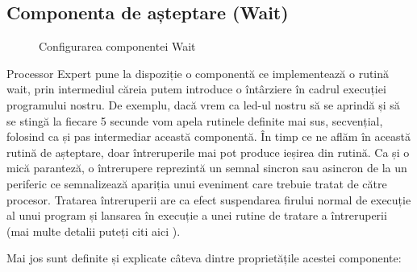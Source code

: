 \newpage

\subsection{Componenta de așteptare (Wait)}

\begin{figure}
    \vspace{-25pt}
    \vspace{-20pt}
    \caption{\label{fig:CodeWarrior-Wait} Configurarea componentei Wait}
    \vspace{-10pt}
\end{figure}

Processor Expert pune la dispoziție o componentă ce implementează o rutină wait, prin intermediul căreia putem introduce o întârziere în cadrul execuției programului nostru. De exemplu, dacă vrem ca led-ul nostru să se aprindă și să se stingă la fiecare 5 secunde vom apela rutinele definite mai sus, secvențial, folosind ca și pas intermediar această componentă. În timp ce ne aflăm în această rutină de așteptare, doar întreruperile mai pot produce ieșirea din rutină. Ca și o mică paranteză, o întrerupere reprezintă un semnal sincron sau asincron de la un periferic ce semnalizează apariția unui
eveniment care trebuie tratat de către procesor. Tratarea întreruperii are ca efect suspendarea firului normal de execuție al unui program și lansarea în execuție a unei rutine de tratare a întreruperii (mai multe detalii puteți citi aici \cite{interupereBib}).

Mai jos sunt definite și explicate câteva dintre proprietățile acestei componente:

